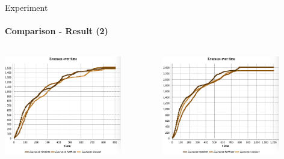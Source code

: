 \documentclass{beamer}
\begin{document}
\begin{frame}[fragile]{Experiment}
\framesubtitle{Comparison - Result (2)}

\begin{columns}
\begin{column}{0.5\textwidth}
\includegraphics[width=0.8\textwidth]{img/3-Simulation-2000people.png}
\end{column}

\begin{column}{0.5\textwidth}
\includegraphics[width=0.8\textwidth]{img/3-Simulation-3000people.png}
\end{column}

\end{columns}

\end{frame}
\end{document}
